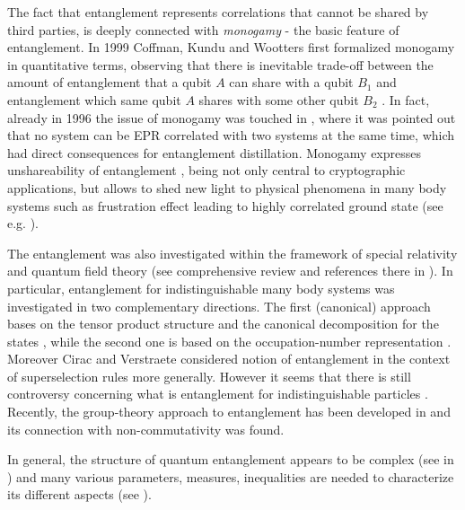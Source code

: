 \documentclass[rmp,12pt,preprint]{revtex4-2}
\begin{document}
The fact that entanglement represents correlations that cannot be
shared by third parties, is deeply connected with {\it monogamy} - the
basic feature of entanglement. In 1999 Coffman, Kundu and Wootters
first formalized monogamy in quantitative terms, observing that there
is inevitable trade-off between the amount of entanglement that a
qubit $A$ can share with a qubit $B_1$ and entanglement which same
qubit $A$ shares with some other qubit $B_2$
\cite{CoffmanKW-tangle}. In fact, already in 1996 the issue of
monogamy was touched in \cite{BDSW1996}, where it was pointed out that
no system can be EPR correlated with two systems at the same time,
which had direct consequences for entanglement distillation.  Monogamy
expresses unshareability of entanglement \cite {Terhal1}, being not
only central to cryptographic applications, but allows to shed new
light to physical phenomena in many body systems such as frustration
effect leading to highly correlated ground state (see
e.g. \cite{DawsonN2004-frustration}).

The entanglement was also investigated within the framework of special
relativity and quantum field theory \cite
{SummersW,AlsingM,CabanR,Czachor1,PeresST,Terno,JordanSS} (see
comprehensive review and references there in \cite {PeresTerno}). In
particular, entanglement for indistinguishable many body systems was
investigated in two complementary directions. The first (canonical)
approach bases on the tensor product structure and the canonical
decomposition for the states \cite
{SchliemannCKML-fermion,EckertSBL-fermion,PaskauskasY,LiZLL}, while
the second one is based on the occupation-number representation \cite
{Zanardi,ZanardiW}. Moreover Cirac and Verstraete \cite{VerCir03}
considered notion of entanglement in the context of superselection
rules more generally.  However it seems that there is still
controversy concerning what is entanglement for indistinguishable
particles \cite{WisVac03}. Recently, the group-theory approach to
entanglement has been developed in \cite{KobriczL_grupent2006} and its
connection with non-commutativity was found.

In general, the structure of quantum entanglement appears to be
complex (see in \cite {Gurvits1}) and many various parameters,
measures, inequalities are needed to characterize its different
aspects (see
\cite{BengtssonZyczkowski-book,Alber2001,BrussReview,BrussReflections,Eckert,TerhalReview,DagBook}).
\end{document}
